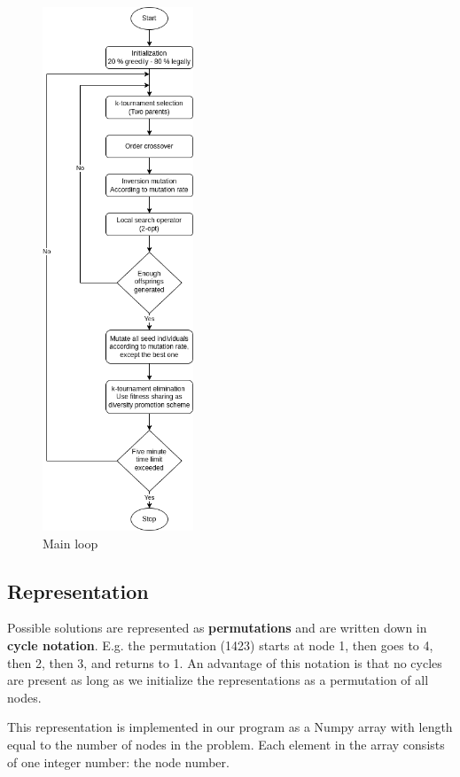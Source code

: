 \documentclass[a4paper,10pt]{article}
\begin{document}
\begin{figure}[H]
\caption{Main loop}
\label{main_loop}
\centering
\hspace*{-3.10cm}
\includegraphics[width=0.4\textwidth]{flowchart.png}
\end{figure}

\clearpage
\subsection{Representation}
Possible solutions are represented as \textbf{permutations} and are written down in \textbf{cycle notation}. E.g. the permutation (1423) starts at node 1, then goes to 4, then 2, then 3, and returns to 1. An advantage of this notation is that no cycles are present as long as we initialize the representations as a permutation of all nodes. 

This representation is implemented in our program as a Numpy array with length equal to the number of nodes in the problem. Each element in the array consists of one integer number: the node number.
\end{document}
